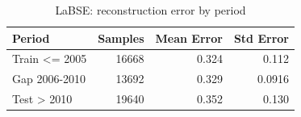\begin{table}[ht]
\centering
\caption{LaBSE: reconstruction error by period}
\label{tab:labse_period_error_summary}
\begin{tabular}{lrrr}
\toprule
Period & Samples & Mean Error & Std Error \\
\midrule
Train <= 2005 & 16668 & 0.324 & 0.112 \\
Gap 2006-2010 & 13692 & 0.329 & 0.0916 \\
Test > 2010 & 19640 & 0.352 & 0.130 \\
\bottomrule
\end{tabular}
\end{table}
